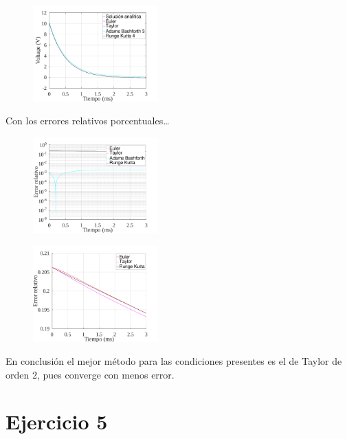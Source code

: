 \documentclass[letterpaper, 10 pt, conference]{ieeeconf}  %
\begin{document}
\begin{figure}[H]
\centering
\includegraphics[width=0.43\textwidth]{../plots/ej4/ej4-metodos-2.png}
\end{figure}

\begin{text}Con los errores relativos porcentuales\ldots \end{text}

\begin{figure}[H]
\centering
\includegraphics[width=0.43\textwidth]{../plots/ej4/ej4-errores-1.png}
\label{fig:fig}
\end{figure}

\begin{figure}[H]
\centering
\includegraphics[width=0.43\textwidth]{../plots/ej4/ej4-errores-2.png}
\label{fig:fig}
\end{figure}

En conclusi\'on el mejor m\'etodo para las condiciones presentes es el de Taylor de orden 2, pues converge con menos error.

\section{Ejercicio 5}
\end{document}
